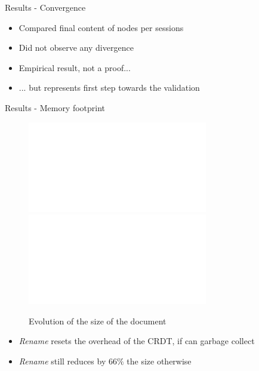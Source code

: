 \documentclass[10pt]{beamer}
\begin{document}
\begin{frame}{Results - Convergence}
  \begin{itemize}
    \item Compared final content of nodes per sessions
    \item Did not observe any divergence
    \bigskip
    \item Empirical result, not a proof...
    \item ... but represents first step towards the validation
  \end{itemize}
\end{frame}

\begin{frame}{Results - Memory footprint}
  \begin{figure}
    \centering
    \includegraphics<2>[width=0.7\textwidth]{img/snapshots-sizes-2.pdf}
    \includegraphics<3>[width=0.7\textwidth]{img/snapshots-sizes.pdf}
    \caption{Evolution of the size of the document}
    \label{fig:evolution-document-size}
  \end{figure}

  \vspace{-1\baselineskip}
  \begin{itemize}
    \item<2-> \emph{Rename} resets the overhead of the CRDT, if can garbage collect
    \item<3> \emph{Rename} still reduces by $66\%$ the size otherwise
  \end{itemize}
\end{frame}
\end{document}
